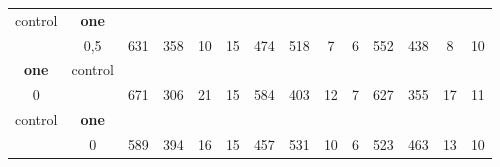 \begin{table}[]
{\begin{tabular}{|c|c|c|c|c|c|c|c|c|c|c|c|c|c|}
control & \cellcolor{blue!15}\textbf{one}& {\color[HTML]{00009B} } & {\color[HTML]{9A0000} } & {\color[HTML]{009901} } &  & {\color[HTML]{00009B} } & {\color[HTML]{9A0000} } & {\color[HTML]{009901} } &  & {\color[HTML]{00009B} } & {\color[HTML]{9A0000} } & {\color[HTML]{009901} } &  \\ 
 & \cellcolor{ blue!15}0,5 & \multirow{-2}{*}{{\color[HTML]{00009B} 631}} & \multirow{-2}{*}{{\color[HTML]{9A0000} 358}} & \multirow{-2}{*}{{\color[HTML]{009901} 10}} & \multirow{-2}{*}{15} & \multirow{-2}{*}{{\color[HTML]{00009B} 474}} & \multirow{-2}{*}{{\color[HTML]{9A0000} 518}} & \multirow{-2}{*}{{\color[HTML]{009901} 7}} & \multirow{-2}{*}{6} & \multirow{-2}{*}{{\color[HTML]{00009B} 552}} & \multirow{-2}{*}{{\color[HTML]{9A0000} 438}} & \multirow{-2}{*}{{\color[HTML]{009901} 8}} & \multirow{-2}{*}{10} \\ \hline

\cellcolor{blue!15}\textbf{one} & control& {\color[HTML]{00009B} } & {\color[HTML]{9A0000} } & {\color[HTML]{009901} } &  & {\color[HTML]{00009B} } & {\color[HTML]{9A0000} } & {\color[HTML]{009901} } &  & {\color[HTML]{00009B} } & {\color[HTML]{9A0000} } & {\color[HTML]{009901} } &  \\ 
\cellcolor{ blue!15}0 &  & \multirow{-2}{*}{{\color[HTML]{00009B} 671}} & \multirow{-2}{*}{{\color[HTML]{9A0000} 306}} & \multirow{-2}{*}{{\color[HTML]{009901} 21}} & \multirow{-2}{*}{15} & \multirow{-2}{*}{{\color[HTML]{00009B} 584}} & \multirow{-2}{*}{{\color[HTML]{9A0000} 403}} & \multirow{-2}{*}{{\color[HTML]{009901} 12}} & \multirow{-2}{*}{7} & \multirow{-2}{*}{{\color[HTML]{00009B} 627}} & \multirow{-2}{*}{{\color[HTML]{9A0000} 355}} & \multirow{-2}{*}{{\color[HTML]{009901} 17}} & \multirow{-2}{*}{11} \\ \hline

control & \cellcolor{blue!15}\textbf{one}& {\color[HTML]{00009B} } & {\color[HTML]{9A0000} } & {\color[HTML]{009901} } &  & {\color[HTML]{00009B} } & {\color[HTML]{9A0000} } & {\color[HTML]{009901} } &  & {\color[HTML]{00009B} } & {\color[HTML]{9A0000} } & {\color[HTML]{009901} } &  \\ 
 & \cellcolor{ blue!15}0 & \multirow{-2}{*}{{\color[HTML]{00009B} 589}} & \multirow{-2}{*}{{\color[HTML]{9A0000} 394}} & \multirow{-2}{*}{{\color[HTML]{009901} 16}} & \multirow{-2}{*}{15} & \multirow{-2}{*}{{\color[HTML]{00009B} 457}} & \multirow{-2}{*}{{\color[HTML]{9A0000} 531}} & \multirow{-2}{*}{{\color[HTML]{009901} 10}} & \multirow{-2}{*}{6} & \multirow{-2}{*}{{\color[HTML]{00009B} 523}} & \multirow{-2}{*}{{\color[HTML]{9A0000} 463}} & \multirow{-2}{*}{{\color[HTML]{009901} 13}} & \multirow{-2}{*}{10} \\ \hline


\end{tabular}}
\end{table}
